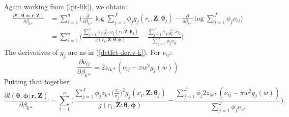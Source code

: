 \documentclass[10pt]{article}
\begin{document}
Again working from (\ref{pt-lik}), we obtain:
\begin{align*}
\frac{\partial l(\boldsymbol{\theta}, \boldsymbol{\phi}; \mathbf{r},\mathbf{Z})}{\partial \beta_{k*}}  &= \sum_{i=1}^n \Big( \frac{\partial}{\partial \beta_{k*}} \log \sum_{j=1}^J \phi_j g_j(r_i,\mathbf{Z}; \boldsymbol{\theta}_j) - \frac{\partial}{\partial \beta_{k*}}\log \sum_{j=1}^J \phi_j \nu_{ij}\Big)\\
&= \sum_{i=1}^n \Big( \frac{ \sum_{j=1}^J \phi_{j} \frac{\partial}{\partial \beta_{k*}}  g_{j} (r_i,\mathbf{Z}; \boldsymbol{\theta}_j)}{g(r_i,\mathbf{Z}; \boldsymbol{\theta}, \boldsymbol{\phi})} - \frac{ \sum_{j=1}^J \phi_{j}\frac{\partial}{\partial \beta_{k*}}  \nu_{ij} }{ \sum_{j=1}^J \phi_j \nu_{ij}}\Big)
\end{align*}
The derivatives of $g_j$ are as in (\ref{detfct-deriv-k}). For $\nu_{ij}$:
\begin{equation*}
\frac{\partial \nu_{ij}}{\partial \beta_{k*}} =  2z_{ik*}(\nu_{ij} - \pi w^2 g_j(w))
\end{equation*}
Putting that together:
\begin{equation*}
\frac{\partial l(\boldsymbol{\theta}, \boldsymbol{\phi}; \mathbf{r},\mathbf{Z})}{\partial \beta_{k*}}  = \sum_{i=1}^n \Big( \frac{ \sum_{j=1}^J \phi_{j} z_{k*} \Big( \frac{x_i}{\sigma_{j}}\Big)^2 g_j(x_i,\mathbf{Z}; \boldsymbol{\theta}_j)}{g(r_i,\mathbf{Z}; \boldsymbol{\theta}, \boldsymbol{\phi})} - \frac{ \sum_{j=1}^J \phi_{j}2z_{ik*}(\nu_{ij} - \pi w^2 g_j(w)) }{ \sum_{j=1}^J \phi_j \nu_{ij}}\Big).
\end{equation*}
\end{document}
